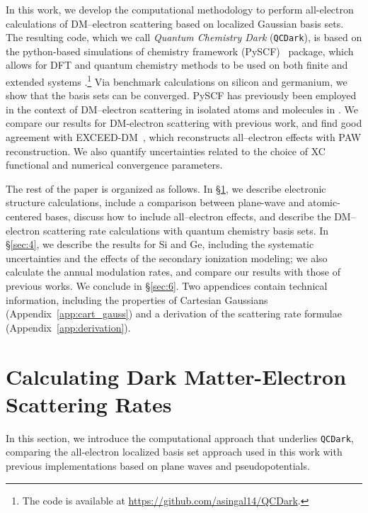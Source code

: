 \documentclass[
    prd, twocolumn, superscriptaddress, nofootinbib, amsmath, amssymb,
    aps, floatfix,preprintnumbers
]{revtex4-2}
\begin{document}
    In this work, we develop the computational methodology to perform all-electron calculations of DM--electron scattering based on localized Gaussian basis sets. The resulting code, which we call \textit{Quantum Chemistry Dark} (\texttt{QCDark}), is based on the python-based simulations of chemistry framework (PySCF)~\cite{PySCF2015, PySCF2018, PySCF2020} package, which allows for DFT and quantum chemistry methods to be used on both finite and extended systems .\footnote{The code is available at \href{https://github.com/asingal14/QCDark}{https://github.com/asingal14/QCDark}.} Via benchmark calculations on silicon and germanium, we show that the basis sets can be converged. PySCF has previously been employed in the context of DM--electron scattering in isolated atoms and molecules in \cite{Hamaide:2021hlp}. We compare our results for DM-electron scattering with previous work, and find good agreement with EXCEED-DM~\cite{Griffin21, Trickle2022}, which reconstructs all--electron effects with PAW reconstruction. We also quantify uncertainties related to the choice of XC functional and numerical convergence parameters. 
    
    The rest of the paper is organized as follows. In \S\ref{sec:2}, we describe electronic structure calculations, include a comparison between plane-wave and atomic-centered bases, discuss how to include all--electron effects, and describe the DM--electron scattering rate calculations with quantum chemistry basis sets. In \S\ref{sec:4}, we describe the results for Si and Ge, including the systematic uncertainties and the effects of the secondary ionization modeling; we also calculate the annual modulation rates, and compare our results with those of previous works.  We conclude in \S\ref{sec:6}. Two appendices contain technical information, including the properties of Cartesian Gaussians (Appendix~\ref{app:cart_gauss}) and a derivation of the scattering rate formulae (Appendix~\ref{app:derivation}). 
    
\section{Calculating Dark Matter-Electron Scattering Rates}\label{sec:2}
    
    In this section, we introduce the computational approach that underlies \texttt{QCDark}, comparing the all-electron localized basis set approach used in this work with previous implementations based on plane waves and pseudopotentials.
    
\end{document}
